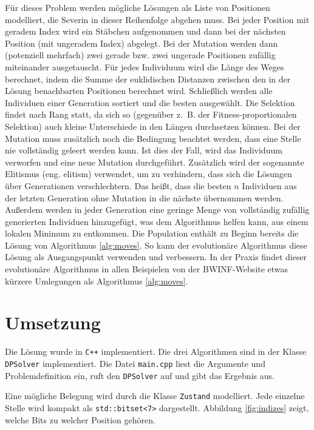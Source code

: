 \documentclass[a4paper,10pt,ngerman]{scrartcl}
\begin{document}
Für dieses Problem werden mögliche Lösungen als Liste von Positionen modelliert, die Severin in dieser Reihenfolge abgehen muss. 
Bei jeder Position mit geradem Index wird ein Stäbchen aufgenommen und dann bei der nächsten Position (mit ungeradem Index) abgelegt. 
Bei der Mutation werden dann (potenziell mehrfach) zwei gerade bzw. zwei ungerade Positionen zufällig miteinander ausgetauscht. 
Für jedes Individuum wird die Länge des Weges berechnet, indem die Summe der euklidischen Distanzen zwischen den in der Lösung benachbarten Positionen berechnet wird.
Schließlich werden alle Individuen einer Generation sortiert und die besten ausgewählt.
Die Selektion findet nach Rang statt, da sich so (gegenüber z.\ B. der Fitness-proportionalen Selektion) auch kleine Unterschiede in den Längen durchsetzen können. 
Bei der Mutation muss zusätzlich noch die Bedingung beachtet werden, dass eine Stelle nie vollständig geleert werden kann.
Ist dies der Fall, wird das Individuum verworfen und eine neue Mutation durchgeführt. 
Zusätzlich wird der sogenannte Elitismus (eng. elitism) verwendet, um zu verhindern, dass sich die Lösungen über Generationen verschlechtern. 
Das heißt, dass die besten $n$ Individuen aus der letzten Generation ohne Mutation in die nächste übernommen werden. 
Außerdem werden in jeder Generation eine geringe Menge von vollständig zufällig generierten Individuen hinzugefügt, was dem Algorithmus helfen kann, aus einem lokalen Minimum zu entkommen. 
Die Population enthält zu Beginn bereits die Lösung von Algorithmus \ref{alg:moves}. So kann der evolutionäre Algorithmus diese Lösung als Ausgangspunkt verwenden und verbessern. 
In der Praxis findet dieser evolutionäre Algorithmus in allen Beispielen von der BWINF-Website etwas kürzere Umlegungen als Algorithmus \ref{alg:moves}.

\section{Umsetzung}
Die Lösung wurde in \texttt{C++} implementiert. Die drei Algorithmen sind in der Klasse \lstinline{DPSolver} implementiert. 
Die Datei \texttt{main.cpp} liest die Argumente und Problemdefinition ein, ruft den \lstinline{DPSolver} auf und gibt das Ergebnis aus. 

Eine mögliche Belegung wird durch die Klasse \lstinline{Zustand} modelliert. 
Jede einzelne Stelle wird kompakt als \lstinline{std::bitset<7>} dargestellt. 
Abbildung \ref{fig:indizes} zeigt, welche Bits zu welcher Position gehören.
\end{document}
